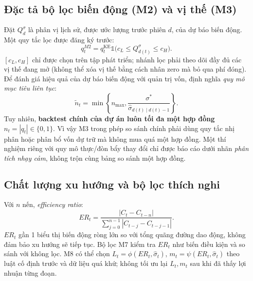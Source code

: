 \documentclass[12pt,a4paper,oneside]{article}
\newcommand{\Ind}{\mathbb{1}}
\begin{document}
\subsection{Đặc tả bộ lọc biến động (M2) và vị thế (M3)}
Đặt $Q_d^{\sigma}$ là phân vị lịch sử, được ước lượng trước phiên $d$, của dự báo biến động. Một quy tắc lọc được đăng ký trước:
\begin{equation}
q_t^{M2}=q_t^{\mathrm{KE}}\Ind\big(c_L\leq Q_{d(t)}^{\sigma}\leq c_H\big).
\end{equation}
$[c_L,c_H]$ chỉ được chọn trên tập phát triển; nhánh lọc phải theo dõi đầy đủ các vị thế đang mở (không thể xóa vị thế bằng cách nhân zero mà bỏ qua phí đóng). Để đánh giá hiệu quả của dự báo biến động với quản trị vốn, định nghĩa \emph{quy mô mục tiêu liên tục}:
\begin{equation}
\widetilde n_t=\min\left\{n_{\max},\frac{\sigma^*}{\widehat\sigma_{d(t)\mid d(t)-1}}\right\}.
\end{equation}
Tuy nhiên, \textbf{backtest chính của dự án luôn tối đa một hợp đồng} $n_t=|q_t|\in\{0,1\}$. Vì vậy M3 trong phép so sánh chính phải dùng quy tắc nhị phân hoặc phân bổ vốn dự trữ mà không mua quá một hợp đồng. Một thí nghiệm riêng với quy mô thực/đòn bẩy thay đổi chỉ được báo cáo dưới nhãn \emph{phân tích nhạy cảm}, không trộn cùng bảng so sánh một hợp đồng.

\subsection{Chất lượng xu hướng và bộ lọc thích nghi}
Với $n$ nến, \emph{efficiency ratio}:
\begin{equation}
ER_t=\frac{|C_t-C_{t-n}|}{\sum_{j=0}^{n-1}|C_{t-j}-C_{t-j-1}|}.
\end{equation}
$ER_t$ gần 1 biểu thị biến động ròng lớn so với tổng quãng đường dao động, không đảm bảo xu hướng sẽ tiếp tục. Bộ lọc M7 kiểm tra $ER_t$ như biến điều kiện và so sánh với không lọc. M8 có thể chọn $L_t=\phi(ER_t,\widehat\sigma_t)$, $m_t=\psi(ER_t,\widehat\sigma_t)$ theo luật cố định trước và dữ liệu quá khứ; không tối ưu lại $L_t,m_t$ sau khi đã thấy lợi nhuận từng đoạn.
\end{document}
